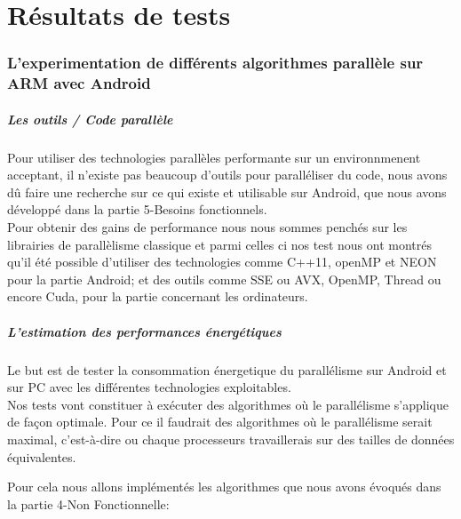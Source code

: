 \chapter{Résultats de tests}

\subsection{ L'experimentation de différents algorithmes parallèle sur ARM avec Android }

\paragraph{Les outils / Code parallèle \\}

	Pour utiliser des technologies parallèles performante sur un environnmenent acceptant, il n'existe pas beaucoup d'outils pour paralléliser du code, nous avons dû faire une recherche sur ce qui existe et utilisable sur Android, que nous avons développé dans la partie 5-Besoins fonctionnels. \\

	Pour obtenir des gains de performance nous nous sommes penchés sur les librairies de parallèlisme classique et parmi celles ci nos test nous ont montrés qu'il été possible d'utiliser des technologies comme C++11, openMP et NEON pour la partie Android; et des outils comme SSE ou AVX, OpenMP, Thread ou encore Cuda, pour la partie concernant les ordinateurs. \\

\paragraph{L'estimation des performances énergétiques \\}

	Le but est de tester la consommation énergetique du parallélisme sur Android et sur PC avec les différentes technologies exploitables. \\

	Nos tests vont constituer à exécuter des algorithmes où le parallélisme s'applique de façon optimale. Pour ce il faudrait des algorithmes où le parallélisme serait maximal, c'est-à-dire ou chaque processeurs travaillerais sur des tailles de données équivalentes.

	Pour cela nous allons implémentés les algorithmes que nous avons évoqués dans la partie 4-Non Fonctionnelle: